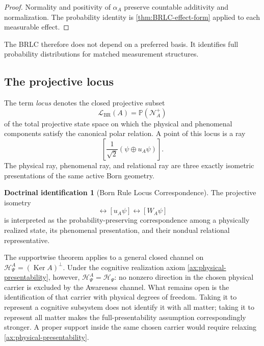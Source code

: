 \documentclass[11pt,reqno]{scrartcl}
\newcommand{\scrHP}{\mathscr H_{\Psi}}
\newcommand{\polA}{u_A}
\DeclareMathOperator{\Ker}{Ker}
\newcommand{\projective}[1]{\mathbb P\!\left(#1\right)}
\newcommand{\actHP}{\mathscr H_{\Psi}^{A}}
\newcommand{\NAplus}{\mathscr N_{A}^{+}}
\newcommand{\WA}{W_{A}}
\newcommand{\LBR}{\mathscr L_{\mathrm{BR}}(A)}
\newcommand{\alphaA}{\alpha_{A}}
\theoremstyle{plain}
\theoremstyle{definition}
\newtheorem{identification}[identification]{Doctrinal identification}
\theoremstyle{remark}
\begin{document}
\begin{proof}
Normality and positivity of \(\alphaA\) preserve countable additivity and
normalization.  The probability identity is
\cref{thm:BRLC-effect-form} applied to each measurable effect.
\end{proof}

The BRLC therefore does not depend on a preferred basis.  It identifies full
probability distributions for matched measurement structures.

\subsection{The projective locus}

The term \emph{locus} denotes the closed projective subset
\begin{equation}
  \LBR=\projective{\NAplus}
  \label{eq:locus-not-spacetime}
\end{equation}
of the total projective state space on which the physical and phenomenal
components satisfy the canonical polar relation.  A point of this locus is a
ray
\begin{equation}
  \left[
  \frac1{\sqrt2}
  \left(\psi\oplus\polA\psi\right)
  \right].
  \label{eq:point-on-BR-locus}
\end{equation}
The physical ray, phenomenal ray, and relational ray are three exactly
isometric presentations of the same active Born geometry.

\begin{identification}[Born Rule Locus Correspondence]
\label{id:BRLC-doctrinal}
The projective isometry
\begin{equation}
  [\psi]
  \longleftrightarrow
  [\polA\psi]
  \longleftrightarrow
  [\WA\psi]
  \label{eq:BRLC-doctrinal-triangle}
\end{equation}
is interpreted as the probability-preserving correspondence among a
physically realized state, its phenomenal presentation, and their nondual
relational representative.
\end{identification}

The supportwise theorem applies to a general closed channel on
\(\actHP=(\Ker A)^\perp\).  Under the cognitive realization axiom
\cref{ax:physical-presentability}, however, \(\actHP=\scrHP\): no
nonzero direction in the chosen physical carrier is excluded by the
Awareness channel.  What remains open is the identification of that
carrier with physical degrees of freedom.  Taking it to represent a
cognitive subsystem does not identify it with all matter; taking it to
represent all matter makes the full-presentability assumption correspondingly
stronger.  A proper support inside the same chosen carrier would require
relaxing \cref{ax:physical-presentability}.
\end{document}
